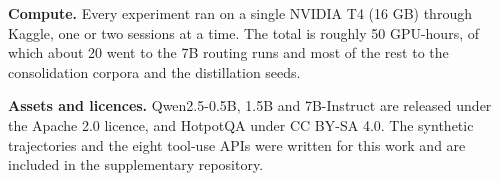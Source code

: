 \documentclass[10pt]{article}
\begin{document}
\textbf{Compute.} Every experiment ran on a single NVIDIA T4 (16 GB) through Kaggle, one or two
sessions at a time. The total is roughly 50 GPU-hours, of which about 20 went to the 7B
routing runs and most of the rest to the consolidation corpora and the distillation seeds.

\textbf{Assets and licences.} Qwen2.5-0.5B, 1.5B and 7B-Instruct are released under the Apache 2.0
licence, and HotpotQA under CC BY-SA 4.0. The synthetic trajectories and the eight tool-use
APIs were written for this work and are included in the supplementary repository.
\end{document}
